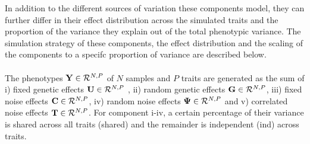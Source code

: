 In addition to the different sources of variation these components model, they can further differ in their effect distribution across the simulated traits and the proportion of the variance they explain out of the total phenotypic variance. The simulation strategy of these components, the effect distribution and the scaling of the components to a specifc proportion of variance are described below. 
\\
\\
The phenotypes \( \boldsymbol{\mathbf{Y}} \in \mathcal{R}^{N,P}\) of \(N\) samples and \(P\) traits are generated as the sum of i) fixed genetic effects \( \boldsymbol{\mathbf{U}} \in \mathcal{R}^{N,P}\) , ii) random genetic effects \( \boldsymbol{\mathbf{G}} \in \mathcal{R}^{N,P}\), iii) fixed noise effects \( \boldsymbol{\mathbf{C}} \in \mathcal{R}^{N,P}\), iv) random noise effects \( \boldsymbol{\mathbf{\Psi}} \in \mathcal{R}^{N,P}\) and v) correlated noise effects \( \boldsymbol{\mathbf{T}} \in \mathcal{R}^{N,P}\). For component i-iv, a certain percentage of their variance is shared across all traits (shared) and the remainder is independent (ind) across traits.

